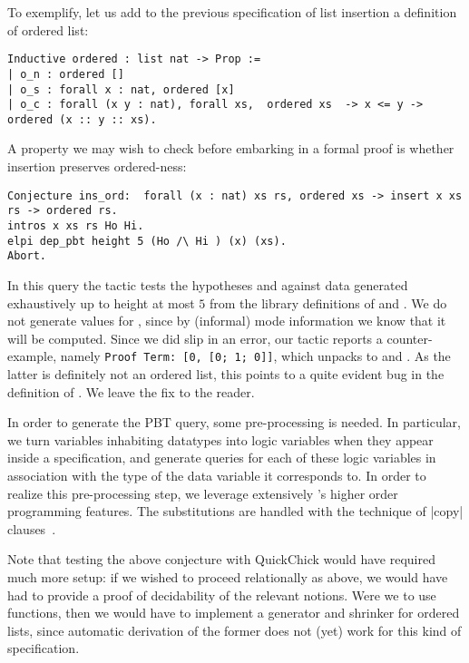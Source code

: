 To exemplify, let us add to the previous specification of list
insertion a definition of ordered list:
\begin{lstlisting}
Inductive ordered : list nat -> Prop :=
| o_n : ordered []
| o_s : forall x : nat, ordered [x]
| o_c : forall (x y : nat), forall xs,  ordered xs  -> x <= y -> ordered (x :: y :: xs).     
\end{lstlisting}
%
A property we may wish to check before embarking in a formal proof is
whether insertion preserves ordered-ness:
\begin{lstlisting}
Conjecture ins_ord:  forall (x : nat) xs rs, ordered xs -> insert x xs rs -> ordered rs.
intros x xs rs Ho Hi.
elpi dep_pbt height 5 (Ho /\ Hi ) (x) (xs).
Abort.
\end{lstlisting}
In this query the tactic tests the hypotheses  and 
against data  generated exhaustively up to height
at most $5$  from the library  definitions of
 and . We do not generate values for ,
since by (informal) mode information we know that it will be computed.
%
Since we did slip in an error, our tactic reports a counter-example,
namely \verb|Proof Term: [0, [0; 1; 0]]|, which unpacks to 
and . As the latter is definitely not an
ordered list, this points to a quite evident bug in the definition of
. We leave the fix to the reader. %


In order to generate the PBT query, some
pre-processing is needed. In particular, we turn 
variables inhabiting datatypes into \lP logic variables when they appear inside a
specification, and  generate queries %
for each of
these logic variables in association with the type of the data
variable it corresponds to.  In order to realize this pre-processing step,
we leverage extensively \lP's higher order programming features. The
substitutions are handled with the technique of \lsti|copy| clauses~\cite{miller91jlc}.

Note that testing the above conjecture with \textsf{QuickChick} would
have required much more setup: if we wished to proceed relationally as
above, we would have had to provide a proof of decidability of the
relevant notions. Were we to use functions, then we would have to
implement a generator and shrinker for ordered lists, since automatic
derivation of the former does not (yet) work for this kind of specification.


